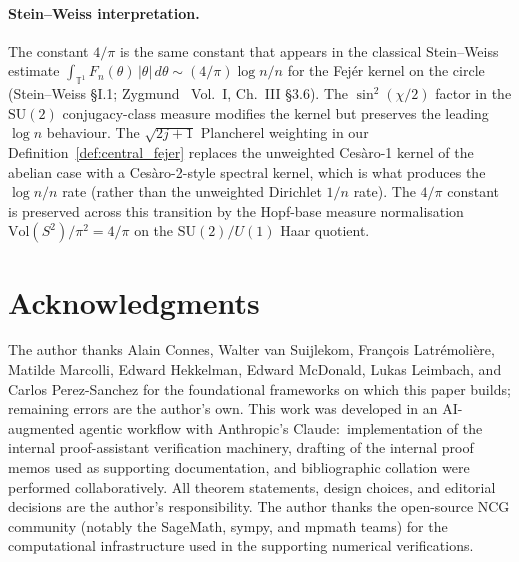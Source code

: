 \documentclass[11pt,a4paper]{article}
\theoremstyle{plain}
\theoremstyle{definition}
\newcommand{\T}{\mathbb{T}}
\newcommand{\SU}{\mathrm{SU}}
\newcommand{\Vol}{\mathrm{Vol}}
\begin{document}
\paragraph{Stein--Weiss interpretation.}
The constant $4/\pi$ is the same constant that appears in the
classical Stein--Weiss estimate
$\int_{\T^1} F_n(\theta)\,|\theta|\,d\theta \sim (4/\pi) \log n / n$
for the Fej\'er kernel on the circle (Stein--Weiss
\cite{stein_weiss1971} \S I.1; Zygmund~\cite{zygmund2002} Vol.~I,
Ch.~III \S 3.6). The $\sin^2(\chi/2)$ factor in the $\SU(2)$
conjugacy-class measure modifies the kernel but preserves the leading
$\log n$ behaviour. The $\sqrt{2j+1}$ Plancherel weighting in our
Definition~\ref{def:central_fejer} replaces the unweighted Ces\`aro-1
kernel of the abelian case with a Ces\`aro-2-style spectral kernel,
which is what produces the $\log n / n$ rate (rather than the
unweighted Dirichlet $1/n$ rate). The $4/\pi$ constant is preserved
across this transition by the Hopf-base measure normalisation
$\Vol(S^2)/\pi^2 = 4/\pi$ on the $\SU(2)/U(1)$ Haar quotient.

\section*{Acknowledgments}

The author thanks Alain Connes, Walter van Suijlekom, Fran\c{c}ois
Latr\'emoli\`ere, Matilde Marcolli, Edward Hekkelman, Edward
McDonald, Lukas Leimbach, and Carlos Perez-Sanchez for the
foundational frameworks on which this paper builds; remaining errors
are the author's own. This work was developed in an AI-augmented
agentic workflow with Anthropic's Claude:\ implementation of the
internal proof-assistant verification machinery, drafting of the
internal proof memos used as supporting documentation, and
bibliographic collation were performed collaboratively. All theorem
statements, design choices, and editorial decisions are the author's
responsibility. The author thanks the open-source NCG community
(notably the SageMath, sympy, and mpmath teams) for the computational
infrastructure used in the supporting numerical verifications.
\end{document}

